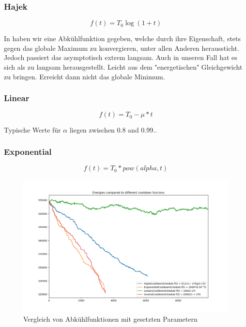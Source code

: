 \subsubsection{Hajek}

\begin{equation}\label{eq:Hajek}
    f(t) = T_0\log(1+t)
\end{equation}

In \cite{hajek1988cooling} haben wir eine Abkühlfunktion gegeben, welche durch ihre Eigenschaft,
stets gegen das globale Maximum zu konvergieren, unter allen Anderen heraussticht.
Jedoch passiert das asymptotisch extrem langsam. Auch in unseren Fall hat 
es sich als zu langsam herausgestellt.
Leicht aus dem "energetischen" Gleichgewicht zu bringen. Erreicht dann nicht 
das globale Minimum.

\subsubsection{Linear}

\begin{equation}\label{eq:lineare Abkühlung}
    f(t) = T_0 - \mu*t
\end{equation}

Typische Werte für $\alpha$ liegen zwischen 0.8 and 0.99.\cite{Kirkpatrick671}.

\subsubsection{Exponential}
\cite{Kirkpatrick671}

\begin{equation}\label{eq:Exponential}
    f(t) = T_0*pow(alpha,t)
\end{equation}

\begin{figure}[H]\label{pic:Cool Down Comparisson}
    \centering
    \includegraphics[width=\linewidth]{content/simulatedAnnealing/Bilder/Energy_Cooldown_compared_steps_9842.png}
    \caption{Vergleich von Abkühlfunktionen mit gesetzten Parametern}
\end{figure}


